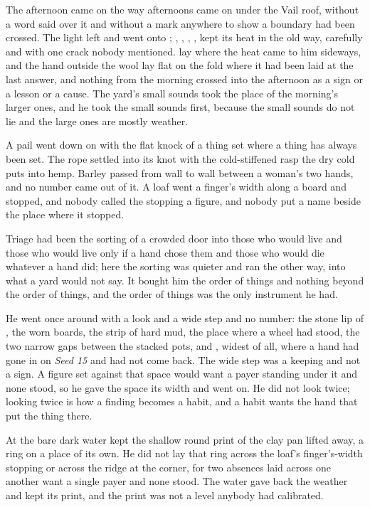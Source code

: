 The afternoon came on the way afternoons came on under the Vail roof, without a word said over it and without a mark anywhere to show a boundary had been crossed. The light left  and went onto ; , , , , kept its heat in the old way, carefully and with one crack nobody mentioned.  lay where the heat came to him sideways, and the hand outside the wool lay flat on the fold where it had been laid at the last answer, and nothing from the morning crossed into the afternoon as a sign or a lesson or a cause. The yard's small sounds took the place of the morning's larger ones, and he took the small sounds first, because the small sounds do not lie and the large ones are mostly weather.

A pail went down on  with the flat knock of a thing set where a thing has always been set. The rope settled into its knot with the cold-stiffened rasp the dry cold puts into hemp. Barley passed from wall to wall between a woman's two hands, and no number came out of it. A loaf went a finger's width along a board and stopped, and nobody called the stopping a figure, and nobody put a name beside the place where it stopped.

Triage had been the sorting of a crowded door into those who would live and those who would live only if a hand chose them and those who would die whatever a hand did; here the sorting was quieter and ran the other way, into what a yard would not say. It bought him the order of things and nothing beyond the order of things, and the order of things was the only instrument he had.

He went once around  with a look and a wide step and no number: the stone lip of , the worn boards, the strip of hard mud, the place where a wheel had stood, the two narrow gaps between the stacked pots, and , widest of all, where a hand had gone in on \emph{Seed 15} and had not come back. The wide step was a keeping and not a sign. A figure set against that space would want a payer standing under it and none stood, so he gave the space its width and went on. He did not look twice; looking twice is how a finding becomes a habit, and a habit wants the hand that put the thing there.

At  the bare dark water kept the shallow round print of the clay pan lifted away, a ring on a place of its own. He did not lay that ring across the loaf's finger's-width stopping or across the ridge at the corner, for two absences laid across one another want a single payer and none stood. The water gave back the weather and kept its print, and the print was not a level anybody had calibrated.

